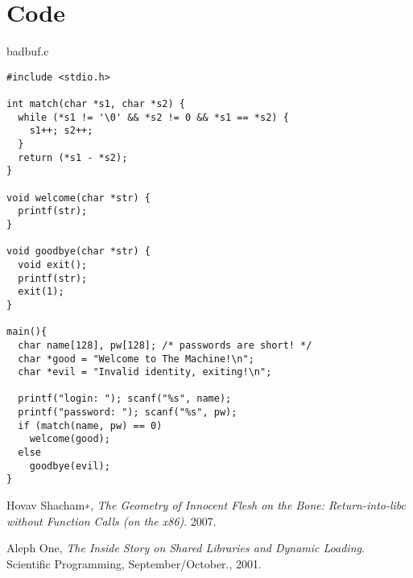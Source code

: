 \documentclass[11pt]{amsart}
\begin{document}
\section*{Code}
badbuf.c
\begin{verbatim}
#include <stdio.h>

int match(char *s1, char *s2) {
  while (*s1 != '\0' && *s2 != 0 && *s1 == *s2) {
    s1++; s2++;
  }
  return (*s1 - *s2);
}

void welcome(char *str) {
  printf(str);
}

void goodbye(char *str) { 
  void exit(); 
  printf(str); 
  exit(1); 
}

main(){
  char name[128], pw[128]; /* passwords are short! */
  char *good = "Welcome to The Machine!\n";
  char *evil = "Invalid identity, exiting!\n";

  printf("login: "); scanf("%s", name);
  printf("password: "); scanf("%s", pw);
  if (match(name, pw) == 0)
    welcome(good);
  else
    goodbye(evil);
}
\end{verbatim}


\begin{thebibliography}{1}

  Hovav Shacham∗,
  \emph{The Geometry of Innocent Flesh on the Bone: Return-into-libc without Function Calls (on the x86)}.
  2007.

  Aleph One,
  \emph{The Inside Story on Shared Libraries and Dynamic Loading}.
  Scientific Programming, September/October.,
  2001.

\end{thebibliography}
\end{document}

